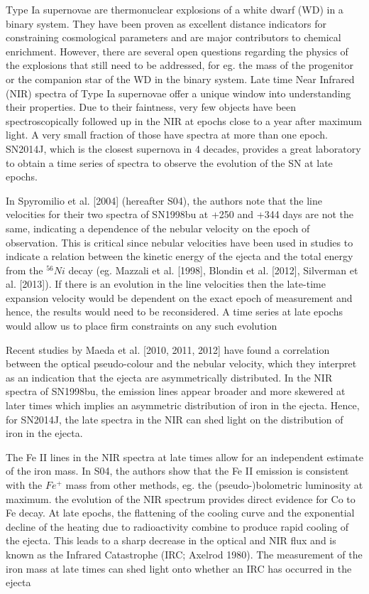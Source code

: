 \documentclass[11pt]{article}
\begin{document}
\sciencejustification    %
Type Ia supernovae are thermonuclear explosions of a white dwarf (WD) in a binary system. They have been proven as excellent distance indicators for constraining cosmological parameters and are major contributors to chemical enrichment. However, there are several open questions regarding the physics of the explosions that still need to be addressed, for eg. the mass of the progenitor or the companion star of the WD in the binary system. 
Late time Near Infrared (NIR) spectra of Type Ia supernovae offer a unique window into understanding their properties. Due to their faintness, very few objects have been spectroscopically followed up in the NIR at epochs close to a year after maximum light. A very small fraction of those have spectra at more than one epoch.
SN2014J, which is the closest supernova in 4 decades, provides a great laboratory to obtain a time series of spectra to observe the evolution of the SN at late epochs.

In Spyromilio et al. [2004] (hereafter S04), the authors note that the line velocities for their two spectra of SN1998bu at +250 and +344 days are not the same, indicating a dependence of the nebular velocity on the epoch of observation. This is critical since nebular velocities have been used in studies to indicate a relation between the kinetic energy of the ejecta and the total energy from the $^{56} Ni$ decay (eg. Mazzali et al. [1998], Blondin et al. [2012], Silverman et al. [2013]). If there is an evolution in the line velocities then the late-time expansion velocity would be dependent on the exact epoch of measurement and hence, the results would need to be reconsidered. A time series at late epochs would allow us to place firm constraints on any such evolution

Recent studies by Maeda et al. [2010, 2011, 2012] have found a correlation between the optical pseudo-colour and the nebular velocity, which they interpret as an indication that the ejecta are asymmetrically distributed. In the NIR spectra of SN1998bu, the emission lines appear broader and more skewered at later times which implies an asymmetric distribution of iron in the ejecta. Hence, for SN2014J, the late spectra in the NIR can shed light on the distribution of iron in the ejecta. 

The Fe II lines in the NIR spectra at late times allow for an independent estimate of the iron mass. In S04, the authors show that the Fe II emission is consistent with the $Fe^{+}$  mass from other methods, eg. the (pseudo-)bolometric luminosity at maximum.
the evolution of the NIR spectrum provides  direct evidence for Co to Fe decay. 
 At late epochs, the flattening of the cooling curve and the exponential decline of the heating due to radioactivity combine to produce rapid cooling of the ejecta. This leads to a sharp decrease in the optical and NIR flux and is known as the Infrared Catastrophe (IRC; Axelrod 1980). The measurement of the iron mass at late times can shed light onto whether an IRC has occurred in the ejecta 
\end{document}

